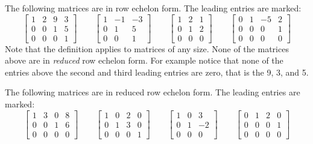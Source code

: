 \begin{example}
The following matrices are in row echelon form.  The leading
entries are marked:
\begin{equation*}
\begin{bmatrix}
\boxed{1} & 2 & 9 & 3 \\
0 & 0 & \boxed{1} & 5 \\
0 & 0 & 0 & \boxed{1}
\end{bmatrix}
\qquad
\begin{bmatrix}
\boxed{1} & -1 & -3  \\
0 & \boxed{1} & 5  \\
0 & 0 & \boxed{1}
\end{bmatrix}
\qquad
\begin{bmatrix}
\boxed{1} & 2 & 1 \\
0 & \boxed{1} & 2 \\
0 & 0 & 0
\end{bmatrix}
\qquad
\begin{bmatrix}
0 & \boxed{1} & -5 & 2 \\
0 & 0 & 0 & \boxed{1} \\
0 & 0 & 0 & 0
\end{bmatrix}
\end{equation*}
Note that the definition applies to matrices of any size.
None of the matrices above are in \emph{reduced} row echelon form.  For
example notice that none of the entries above the second and third leading
entries are zero, that is the 9, 3, and 5.

The following matrices are in reduced row echelon form.  The leading
entries are marked:
\begin{equation*}
\begin{bmatrix}
\boxed{1} & 3 & 0 & 8 \\
0 & 0 & \boxed{1} & 6 \\
0 & 0 & 0 & 0
\end{bmatrix}
\qquad
\begin{bmatrix}
\boxed{1} & 0 & 2 &  0  \\
0 & \boxed{1} & 3 & 0  \\
0 & 0 & 0 & \boxed{1}
\end{bmatrix}
\qquad
\begin{bmatrix}
\boxed{1} & 0 & 3 \\
0 & \boxed{1} & -2 \\
0 & 0 & 0
\end{bmatrix}
\qquad
\begin{bmatrix}
0 & \boxed{1} & 2 & 0 \\
0 & 0 & 0 & \boxed{1} \\
0 & 0 & 0 & 0
\end{bmatrix}
\end{equation*}
\end{example}

